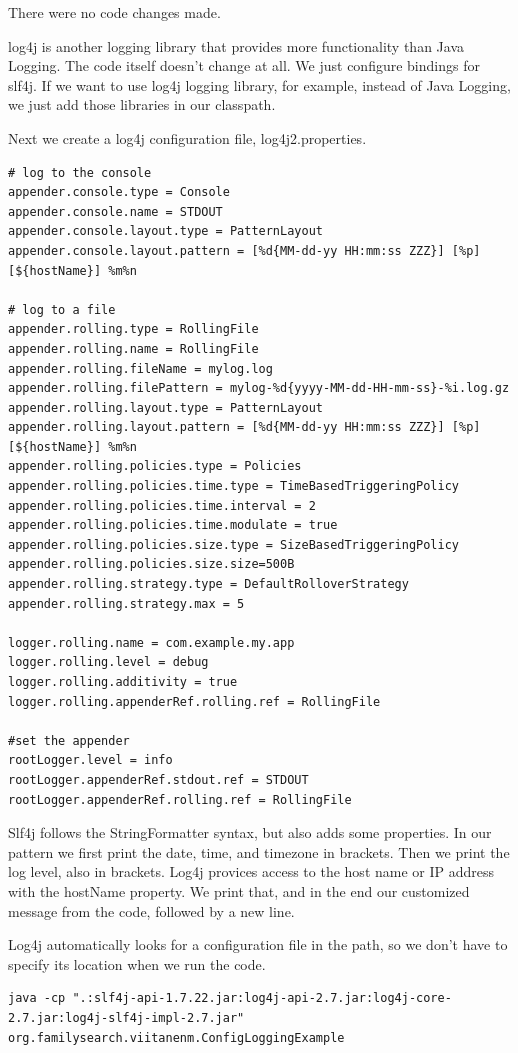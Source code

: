 There were no code changes made.

log4j is another logging library that provides more functionality than Java Logging. The code itself doesn't change at all. We just configure bindings for slf4j. If we want to use log4j logging library, for example, instead of Java Logging, we just add those libraries in our classpath.

Next we create a log4j configuration file, log4j2.properties. 

\begin{lstlisting}
# log to the console
appender.console.type = Console
appender.console.name = STDOUT
appender.console.layout.type = PatternLayout
appender.console.layout.pattern = [%d{MM-dd-yy HH:mm:ss ZZZ}] [%p] [${hostName}] %m%n

# log to a file
appender.rolling.type = RollingFile
appender.rolling.name = RollingFile
appender.rolling.fileName = mylog.log
appender.rolling.filePattern = mylog-%d{yyyy-MM-dd-HH-mm-ss}-%i.log.gz
appender.rolling.layout.type = PatternLayout
appender.rolling.layout.pattern = [%d{MM-dd-yy HH:mm:ss ZZZ}] [%p] [${hostName}] %m%n
appender.rolling.policies.type = Policies
appender.rolling.policies.time.type = TimeBasedTriggeringPolicy
appender.rolling.policies.time.interval = 2
appender.rolling.policies.time.modulate = true
appender.rolling.policies.size.type = SizeBasedTriggeringPolicy
appender.rolling.policies.size.size=500B
appender.rolling.strategy.type = DefaultRolloverStrategy
appender.rolling.strategy.max = 5
 
logger.rolling.name = com.example.my.app
logger.rolling.level = debug
logger.rolling.additivity = true
logger.rolling.appenderRef.rolling.ref = RollingFile

#set the appender
rootLogger.level = info
rootLogger.appenderRef.stdout.ref = STDOUT
rootLogger.appenderRef.rolling.ref = RollingFile
\end{lstlisting}

Slf4j follows the StringFormatter syntax, but also adds some properties. In our pattern we first print the date, time, and timezone in brackets. Then we print the log level, also in brackets. Log4j provices access to the host name or IP address with the hostName property. We print that, and in the end our customized message from the code, followed by a new line.

Log4j automatically looks for a configuration file in the path, so we don't have to specify its location when we run the code.
\begin{lstlisting}
java -cp ".:slf4j-api-1.7.22.jar:log4j-api-2.7.jar:log4j-core-2.7.jar:log4j-slf4j-impl-2.7.jar"  org.familysearch.viitanenm.ConfigLoggingExample
\end{lstlisting}

